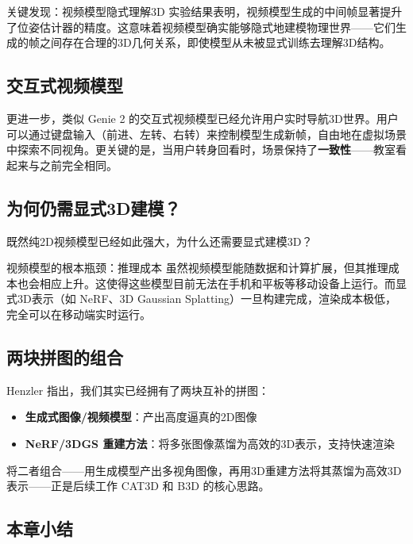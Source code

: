 \documentclass[a4paper]{article}
\begin{document}
\begin{importantbox}{关键发现：视频模型隐式理解3D}
实验结果表明，视频模型生成的中间帧显著提升了位姿估计器的精度。这意味着视频模型确实能够隐式地建模物理世界——它们生成的帧之间存在合理的3D几何关系，即使模型从未被显式训练去理解3D结构。
\end{importantbox}

\subsection{交互式视频模型}

更进一步，类似 Genie 2 的交互式视频模型已经允许用户实时导航3D世界。用户可以通过键盘输入（前进、左转、右转）来控制模型生成新帧，自由地在虚拟场景中探索不同视角。更关键的是，当用户转身回看时，场景保持了\textbf{一致性}——教室看起来与之前完全相同。

\subsection{为何仍需显式3D建模？}

既然纯2D视频模型已经如此强大，为什么还需要显式建模3D？

\begin{warningbox}{视频模型的根本瓶颈：推理成本}
虽然视频模型能随数据和计算扩展，但其推理成本也会相应上升。这使得这些模型目前无法在手机和平板等移动设备上运行。而显式3D表示（如 NeRF、3D Gaussian Splatting）一旦构建完成，渲染成本极低，完全可以在移动端实时运行。
\end{warningbox}

\subsection{两块拼图的组合}

Henzler 指出，我们其实已经拥有了两块互补的拼图：

\begin{itemize}
    \item \textbf{生成式图像/视频模型}：产出高度逼真的2D图像
    \item \textbf{NeRF/3DGS 重建方法}：将多张图像蒸馏为高效的3D表示，支持快速渲染
\end{itemize}

将二者组合——用生成模型产出多视角图像，再用3D重建方法将其蒸馏为高效3D表示——正是后续工作 CAT3D 和 B3D 的核心思路。

\subsection{本章小结}
\end{document}
